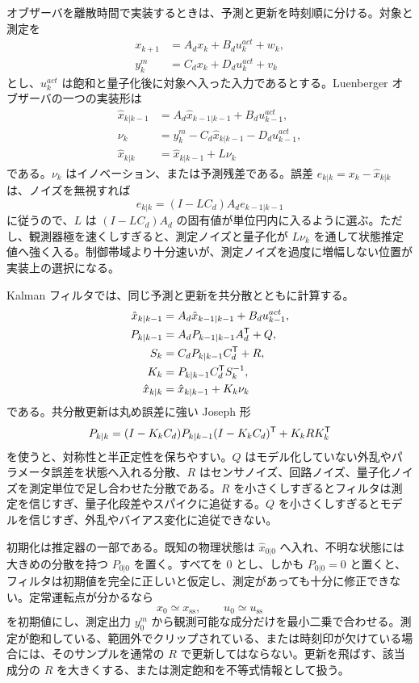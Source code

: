 オブザーバを離散時間で実装するときは、予測と更新を時刻順に分ける。対象と測定を
\begin{align}
  x_{k+1}&=A_dx_k+B_du_k^{act}+w_k,\\
  y_k^{m}&=C_dx_k+D_du_k^{act}+v_k
\end{align}
とし、$u_k^{act}$ は飽和と量子化後に対象へ入った入力であるとする。Luenberger オブザーバの一つの実装形は
\begin{align}
  \hat{x}_{k|k-1}
  &=A_d\hat{x}_{k-1|k-1}+B_du_{k-1}^{act},\\
  \nu_k
  &=y_k^{m}-C_d\hat{x}_{k|k-1}-D_du_{k-1}^{act},\\
  \hat{x}_{k|k}
  &=\hat{x}_{k|k-1}+L\nu_k
\end{align}
である。$\nu_k$ はイノベーション、または予測残差である。誤差 $e_{k|k}=x_k-\hat{x}_{k|k}$ は、ノイズを無視すれば
\begin{equation}
  e_{k|k}=(I-LC_d)A_de_{k-1|k-1}
\end{equation}
に従うので、$L$ は $(I-LC_d)A_d$ の固有値が単位円内に入るように選ぶ。ただし、観測器極を速くしすぎると、測定ノイズと量子化が $L\nu_k$ を通して状態推定値へ強く入る。制御帯域より十分速いが、測定ノイズを過度に増幅しない位置が実装上の選択になる。

Kalman フィルタでは、同じ予測と更新を共分散とともに計算する。
\begin{align}
  \hat{x}_{k|k-1}
  &=A_d\hat{x}_{k-1|k-1}+B_du_{k-1}^{act},\\
  P_{k|k-1}
  &=A_dP_{k-1|k-1}A_d^{\mathsf{T}}+Q,\\
  S_k
  &=C_dP_{k|k-1}C_d^{\mathsf{T}}+R,\\
  K_k
  &=P_{k|k-1}C_d^{\mathsf{T}} S_k^{-1},\\
  \hat{x}_{k|k}
  &=\hat{x}_{k|k-1}+K_k\nu_k
\end{align}
である。共分散更新は丸め誤差に強い Joseph 形
\begin{equation}
  P_{k|k}
  =
  (I-K_kC_d)P_{k|k-1}(I-K_kC_d)^{\mathsf{T}}
  +K_kRK_k^{\mathsf{T}}
\end{equation}
を使うと、対称性と半正定性を保ちやすい。$Q$ はモデル化していない外乱やパラメータ誤差を状態へ入れる分散、$R$ はセンサノイズ、回路ノイズ、量子化ノイズを測定単位で足し合わせた分散である。$R$ を小さくしすぎるとフィルタは測定を信じすぎ、量子化段差やスパイクに追従する。$Q$ を小さくしすぎるとモデルを信じすぎ、外乱やバイアス変化に追従できない。

初期化は推定器の一部である。既知の物理状態は $\hat{x}_{0|0}$ へ入れ、不明な状態には大きめの分散を持つ $P_{0|0}$ を置く。すべてを 0 とし、しかも $P_{0|0}=0$ と置くと、フィルタは初期値を完全に正しいと仮定し、測定があっても十分に修正できない。定常運転点が分かるなら
\begin{equation}
  x_0\simeq x_{\mathrm{ss}},
  \qquad
  u_0\simeq u_{\mathrm{ss}}
\end{equation}
を初期値にし、測定出力 $y_0^m$ から観測可能な成分だけを最小二乗で合わせる。測定が飽和している、範囲外でクリップされている、または時刻印が欠けている場合には、そのサンプルを通常の $R$ で更新してはならない。更新を飛ばす、該当成分の $R$ を大きくする、または測定飽和を不等式情報として扱う。

